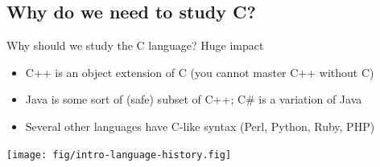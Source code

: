 \subsection{Why do we need to study C?}
\begin{frame}{Why should we study the C language? Huge impact}
    \begin{itemize}
    \item C++ is an object extension of C (you cannot master C++ without C)
    \item Java is some sort of (safe) subset of C++;
    C\# is a variation of Java
    \item Several other languages have C-like syntax (Perl, Python, Ruby, PHP)
    \end{itemize}    
  \vspace{-.8\baselineskip}
  \centerline{\texttt{[image: fig/intro-language-history.fig]}~~%
  ~~%
  }
\end{frame}
